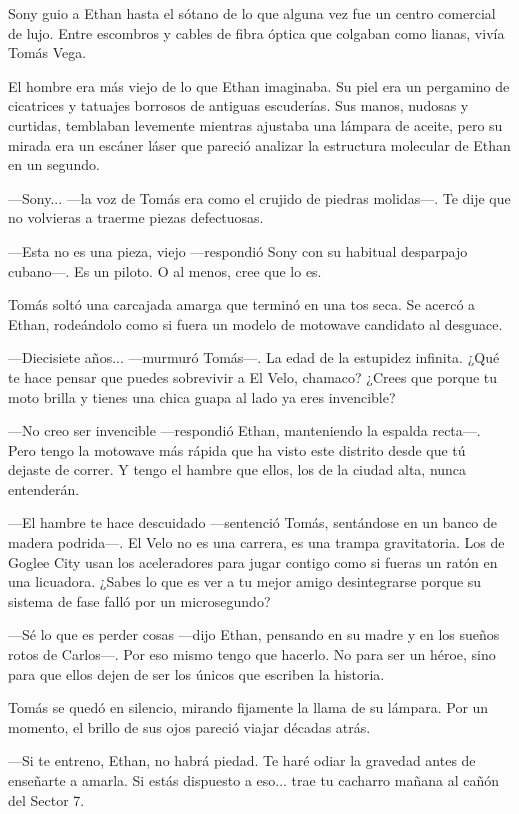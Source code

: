 \documentclass[11pt,twoside]{book}
\begin{document}
Sony guio a Ethan hasta el sótano de lo que alguna vez fue un centro comercial de lujo. Entre escombros y cables de fibra óptica que colgaban como lianas, vivía Tomás Vega.

El hombre era más viejo de lo que Ethan imaginaba. Su piel era un pergamino de cicatrices y tatuajes borrosos de antiguas escuderías. Sus manos, nudosas y curtidas, temblaban levemente mientras ajustaba una lámpara de aceite, pero su mirada era un escáner láser que pareció analizar la estructura molecular de Ethan en un segundo.

---Sony... ---la voz de Tomás era como el crujido de piedras molidas---. Te dije que no volvieras a traerme piezas defectuosas.

---Esta no es una pieza, viejo ---respondió Sony con su habitual desparpajo cubano---. Es un piloto. O al menos, cree que lo es.

Tomás soltó una carcajada amarga que terminó en una tos seca. Se acercó a Ethan, rodeándolo como si fuera un modelo de motowave candidato al desguace.

---Diecisiete años... ---murmuró Tomás---. La edad de la estupidez infinita. ¿Qué te hace pensar que puedes sobrevivir a El Velo, chamaco? ¿Crees que porque tu moto brilla y tienes una chica guapa al lado ya eres invencible?

---No creo ser invencible ---respondió Ethan, manteniendo la espalda recta---. Pero tengo la motowave más rápida que ha visto este distrito desde que tú dejaste de correr. Y tengo el hambre que ellos, los de la ciudad alta, nunca entenderán.

---El hambre te hace descuidado ---sentenció Tomás, sentándose en un banco de madera podrida---. El Velo no es una carrera, es una trampa gravitatoria. Los de Goglee City usan los aceleradores para jugar contigo como si fueras un ratón en una licuadora. ¿Sabes lo que es ver a tu mejor amigo desintegrarse porque su sistema de fase falló por un microsegundo?

---Sé lo que es perder cosas ---dijo Ethan, pensando en su madre y en los sueños rotos de Carlos---. Por eso mismo tengo que hacerlo. No para ser un héroe, sino para que ellos dejen de ser los únicos que escriben la historia.

Tomás se quedó en silencio, mirando fijamente la llama de su lámpara. Por un momento, el brillo de sus ojos pareció viajar décadas atrás.

---Si te entreno, Ethan, no habrá piedad. Te haré odiar la gravedad antes de enseñarte a amarla. Si estás dispuesto a eso... trae tu cacharro mañana al cañón del Sector 7.
\end{document}
